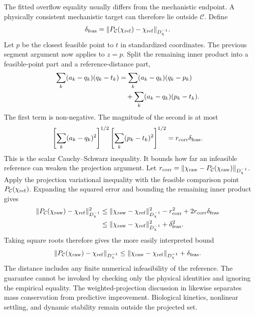 The fitted overflow equality usually differs from the mechanistic endpoint. A physically consistent mechanistic target can therefore lie outside $\mathcal C$. Define
\begin{equation}
\equationname{Distance from the reference state to the projection set}
\delta_{\rm feas}=\|P_{\mathcal C}(\chi_{\rm ref})-\chi_{\rm ref}\|_{D_\chi^{-1}}.
\end{equation}
Let $p$ be the closest feasible point to $t$ in standardized coordinates. The previous segment argument now applies to $z=p$. Split the remaining inner product into a feasible-point part and a reference-distance part,
\begin{align}
\equationname{Cross-term decomposition using a projected reference}
\sum_k(a_k-q_k)(q_k-t_k)
&=\sum_k(a_k-q_k)(q_k-p_k)\\
\equationname{Reference-infeasibility term in the cross-term decomposition}
&\quad+\sum_k(a_k-q_k)(p_k-t_k).
\end{align}
The first term is non-negative. The magnitude of the second is at most
\begin{equation}
\equationname{Product of projection displacement and reference infeasibility}
\left[\sum_k(a_k-q_k)^2\right]^{1/2}
\left[\sum_k(p_k-t_k)^2\right]^{1/2}
=r_{\rm corr}\delta_{\rm feas}.
\end{equation}
This is the scalar Cauchy--Schwarz inequality. It bounds how far an infeasible reference can weaken the projection argument. Let $r_{\rm corr}=\|\chi_{\rm raw}-P_{\mathcal C}(\chi_{\rm raw})\|_{D_\chi^{-1}}$. Apply the projection variational inequality with the feasible comparison point $P_{\mathcal C}(\chi_{\rm ref})$. Expanding the squared error and bounding the remaining inner product gives
\begin{align}
\equationname{Squared-error bound including reference infeasibility}
\|P_{\mathcal C}(\chi_{\rm raw})-\chi_{\rm ref}\|_{D_\chi^{-1}}^2
&\le\|\chi_{\rm raw}-\chi_{\rm ref}\|_{D_\chi^{-1}}^2
-r_{\rm corr}^2+2r_{\rm corr}\delta_{\rm feas}\\
\equationname{Upper error bound using squared reference infeasibility}
&\le\|\chi_{\rm raw}-\chi_{\rm ref}\|_{D_\chi^{-1}}^2+\delta_{\rm feas}^2.
\end{align}
Taking square roots therefore gives the more easily interpreted bound
\begin{equation}
\equationname{Distance bound when the reference is not projection-feasible}
\|P_{\mathcal C}(\chi_{\rm raw})-\chi_{\rm ref}\|_{D_\chi^{-1}}
\le\|\chi_{\rm raw}-\chi_{\rm ref}\|_{D_\chi^{-1}}+\delta_{\rm feas}.
\label{eq:plant_projection_error_general}
\end{equation}
The distance includes any finite numerical infeasibility of the reference. The guarantee cannot be invoked by checking only the physical identities and ignoring the empirical equality. The weighted-projection discussion in \citet{SturmSilva2024} likewise separates mass conservation from predictive improvement. Biological kinetics, nonlinear settling, and dynamic stability remain outside the projected set.

